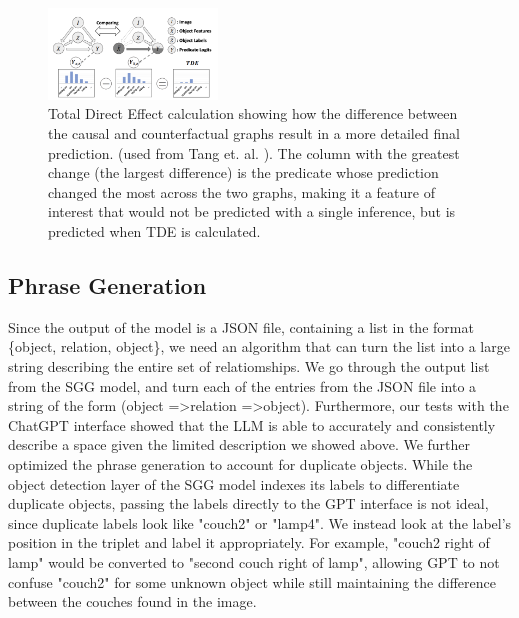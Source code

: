 \documentclass[letterpaper, 10 pt, conference]{ieeeconf}  %
\begin{document}
        \begin{figure}
            \centering
            \includegraphics[width=0.4\textwidth]{images/counterfactual.png}
            \caption{Total Direct Effect calculation showing how the difference between the causal and counterfactual graphs result in a more detailed final prediction. (used from Tang et. al. \cite{tang2020unbiased}). The column with the greatest change (the largest difference) is the predicate whose prediction changed the most across the two graphs, making it a feature of interest that would not be predicted with a single inference, but is predicted when TDE is calculated.}
            \label{fig:counterfactual}
        \end{figure}


    
    \subsection*{Phrase Generation}
        Since the output of the model is a JSON file, containing a list in the format \{object, relation, object\}, we need an algorithm that can turn the list into a large string describing the entire set of relatiomships. We go through the output list from the SGG model, and turn each of the entries from the JSON file into a string of the form (object =\textgreater  relation =\textgreater  object). Furthermore, our tests with the ChatGPT interface showed that the LLM is able to accurately and consistently describe a space given the limited description we showed above. We further optimized the phrase generation to account for duplicate objects. While the object detection layer of the SGG model indexes its labels to differentiate duplicate objects, passing the labels directly to the GPT interface is not ideal, since duplicate labels look like "couch2" or "lamp4". We instead look at the label's position in the triplet and label it appropriately. For example, "couch2 right of lamp" would be converted to "second couch right of lamp", allowing GPT to not confuse "couch2" for some unknown object while still maintaining the difference between the couches found in the image.
    
\end{document}
